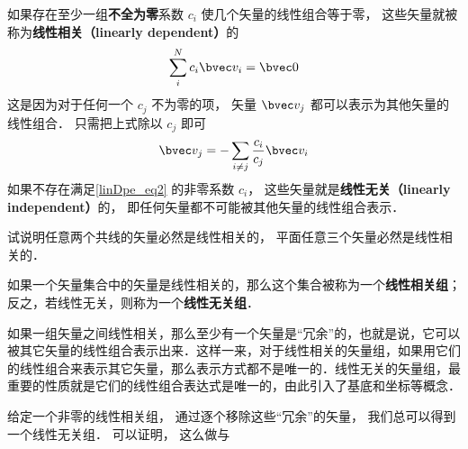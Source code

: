 

如果存在至少一组\textbf{不全为零}系数 $c_i$ 使几个矢量的线性组合等于零， 这些矢量就被称为\textbf{线性相关（linearly dependent）}的
\begin{equation}\label{linDpe_eq2}
\sum_i^N c_i \bvec v_i = \bvec 0
\end{equation}
这是因为对于任何一个 $c_j$ 不为零的项， 矢量 $\bvec v_j$ 都可以表示为其他矢量的线性组合． 只需把上式除以 $c_j$ 即可
\begin{equation}\label{linDpe_eq3}
\bvec v_j = -\sum_{i \ne j}\frac{c_i}{c_j} \bvec v_i
\end{equation}
如果不存在满足\autoref{linDpe_eq2} 的非零系数 $c_i$， 这些矢量就是\textbf{线性无关（linearly independent）}的， 即任何矢量都不可能被其他矢量的线性组合表示． 

\begin{exercise}{}
试说明任意两个共线的矢量必然是线性相关的， 平面任意三个矢量必然是线性相关的．
\end{exercise}

如果一个矢量集合中的矢量是线性相关的，那么这个集合被称为一个\textbf{线性相关组}；反之，若线性无关，则称为一个\textbf{线性无关组}．

如果一组矢量之间线性相关，那么至少有一个矢量是“冗余”的，也就是说，它可以被其它矢量的线性组合表示出来．这样一来，对于线性相关的矢量组，如果用它们的线性组合来表示其它矢量，那么表示方式都不是唯一的．线性无关的矢量组，最重要的性质就是它们的线性组合表达式是唯一的，由此引入了基底和坐标等概念．

给定一个非零的线性相关组， 通过逐个移除这些“冗余”的矢量， 我们总可以得到一个线性无关组． 可以证明， 这么做与
